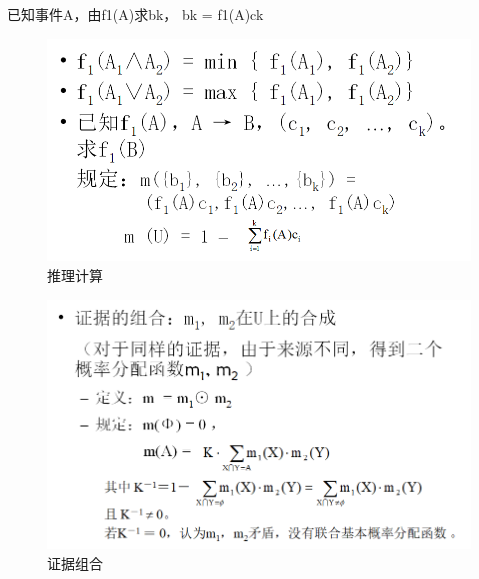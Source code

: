 \documentclass[UTF8,a4paper]{ctexart}
\begin{document}
已知事件A，由f1(A)求bk， bk = f1(A)ck

\begin{figure}[H]
	\centering
	\includegraphics[scale = 0.5]{assets/ArtificialIntelligence/2018-01-09-00-44-55.png}
	\caption{推理计算}
\end{figure}

\begin{figure}[H]
	\centering
	\includegraphics[scale = 0.5]{assets/ArtificialIntelligence/2018-01-09-00-46-51.png}
	\caption{证据组合}
\end{figure}
\end{document}
